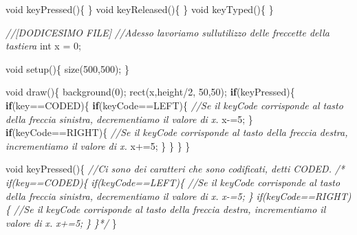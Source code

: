 \documentclass[
]{article}
\newenvironment{Shaded}{}{}
\newcommand{\CommentTok}[1]{\textcolor[rgb]{0.38,0.63,0.69}{\textit{#1}}}
\newcommand{\ControlFlowTok}[1]{\textcolor[rgb]{0.00,0.44,0.13}{\textbf{#1}}}
\newcommand{\DataTypeTok}[1]{\textcolor[rgb]{0.56,0.13,0.00}{#1}}
\newcommand{\DecValTok}[1]{\textcolor[rgb]{0.25,0.63,0.44}{#1}}
\newcommand{\FunctionTok}[1]{\textcolor[rgb]{0.02,0.16,0.49}{#1}}
\newcommand{\NormalTok}[1]{#1}
\newcommand{\OperatorTok}[1]{\textcolor[rgb]{0.40,0.40,0.40}{#1}}
\begin{document}
\begin{Shaded}
\begin{Highlighting}[]
  \DataTypeTok{void} \FunctionTok{keyPressed}\OperatorTok{()\{}
  \OperatorTok{\}}
  \DataTypeTok{void} \FunctionTok{keyReleased}\OperatorTok{()\{}
  \OperatorTok{\}}
  \DataTypeTok{void} \FunctionTok{keyTyped}\OperatorTok{()\{}
  \OperatorTok{\}}
\end{Highlighting}
\end{Shaded}

\begin{Shaded}
\begin{Highlighting}[]
\CommentTok{//[DODICESIMO FILE]}
\CommentTok{//Adesso lavoriamo sull\textquotesingle{}utilizzo delle freccette della tastiera}
\DataTypeTok{int}\NormalTok{ x }\OperatorTok{=} \DecValTok{0}\OperatorTok{;}

\DataTypeTok{void} \FunctionTok{setup}\OperatorTok{()\{}
   \FunctionTok{size}\OperatorTok{(}\DecValTok{500}\OperatorTok{,}\DecValTok{500}\OperatorTok{);} 
\OperatorTok{\}}

\DataTypeTok{void} \FunctionTok{draw}\OperatorTok{()\{}
    \FunctionTok{background}\OperatorTok{(}\DecValTok{0}\OperatorTok{);}
    \FunctionTok{rect}\OperatorTok{(}\NormalTok{x}\OperatorTok{,}\NormalTok{height}\OperatorTok{/}\DecValTok{2}\OperatorTok{,} \DecValTok{50}\OperatorTok{,}\DecValTok{50}\OperatorTok{);}
    \ControlFlowTok{if}\OperatorTok{(}\NormalTok{keyPressed}\OperatorTok{)\{}
        \ControlFlowTok{if}\OperatorTok{(}\NormalTok{key}\OperatorTok{==}\NormalTok{CODED}\OperatorTok{)\{}
        \ControlFlowTok{if}\OperatorTok{(}\NormalTok{keyCode}\OperatorTok{==}\NormalTok{LEFT}\OperatorTok{)\{} \CommentTok{//Se il keyCode corrisponde al tasto della freccia sinistra, decrementiamo il valore di x.}
\NormalTok{            x}\OperatorTok{{-}=}\DecValTok{5}\OperatorTok{;}
        \OperatorTok{\}}
        \ControlFlowTok{if}\OperatorTok{(}\NormalTok{keyCode}\OperatorTok{==}\NormalTok{RIGHT}\OperatorTok{)\{} \CommentTok{//Se il keyCode corrisponde al tasto della freccia destra, incrementiamo il valore di x.}
\NormalTok{            x}\OperatorTok{+=}\DecValTok{5}\OperatorTok{;}
        \OperatorTok{\}}
    \OperatorTok{\}}
    \OperatorTok{\}}
\OperatorTok{\}}

\DataTypeTok{void} \FunctionTok{keyPressed}\OperatorTok{()\{} \CommentTok{//Ci sono dei caratteri che sono codificati, detti \textquotesingle{}CODED\textquotesingle{}.}
\CommentTok{/*    if(key==CODED)\{}
\CommentTok{        if(keyCode==LEFT)\{ //Se il keyCode corrisponde al tasto della freccia sinistra, decrementiamo il valore di x.}
\CommentTok{            x{-}=5;}
\CommentTok{        \}}
\CommentTok{        if(keyCode==RIGHT)\{ //Se il keyCode corrisponde al tasto della freccia destra, incrementiamo il valore di x.}
\CommentTok{            x+=5;}
\CommentTok{        \}}
\CommentTok{    \}*/}
\OperatorTok{\}} 


\end{Highlighting}
\end{Shaded}
\end{document}
